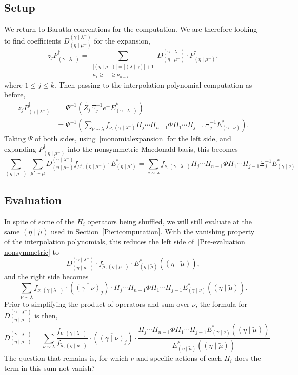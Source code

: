 \documentclass[ALCO]{cedram}
\newcommand{\Estar}[1]{E^*_{#1}}
\newcommand{\PB}[1]{P_{#1}^\dagger}
\newcommand{\nudom}{{( \lambda \mid \gamma )}}
\newcommand{\lambdagamma}{{\nudom}}
\newcommand{\gammalambdamin}{{(\gamma \mid \lambda^-)}}
\newcommand{\gammanu}{{(\gamma \mid \nu)}}
\newcommand{\etamu}{{(\eta \mid \mu^-)}}
\newcommand{\etamuprime}{{(\eta \mid \mu')}}
\newcommand{\mutilde}{{\widetilde{\mu}}}
\newcommand{\etamutilde}{{(\eta \mid \widetilde{\mu})}}
\newcommand{\etamumin}{{(\eta \mid \mu^-)}}
\newcommand{\fnu}{f_{\nu, \gammalambdamin}}
\newcommand{\DBaratta}{D_{\etamumin}^\gammalambdamin}
\begin{document}
\subsection{Setup}
We return to Baratta conventions for the computation. We are therefore looking to find coefficients $\DBaratta$ for the expansion,
\begin{equation} z_j \PB{\gammalambdamin} =\sum_{\substack{|\etamu| = |\lambdagamma| + 1 \\ \mu_1 \geq \, \dotsm \, \geq \mu_{n-k}}}  \DBaratta \cdot \PB{\etamumin}, \end{equation}
where $1\leq j \leq k$. Then passing to the interpolation polynomial computation as before,
\begin{align*}
    z_j \PB{\gammalambdamin} &= \Psi^{-1} \left(\widetilde{Z_j}  \Xi_j^{-1} e^+ \Estar{\gammalambdamin} \right)\\
    &=\Psi^{-1} \left( \sum_{\nu \sim \lambda} \fnu H_j\dotsm H_{n-1} \Phi H_1 \dotsm H_{j-1} \Xi^{-1}_{j} \Estar{\gammanu}\right).
\end{align*}
Taking $\Psi$ of both sides, using~\eqref{monomialexpansion} for the left side, and expanding $\PB{\etamumin}$ into the nonsymmetric Macdonald basis, this becomes
\begin{equation}\label{Pre-evaluation nonsymmetric} \sum_{\etamumin}  \, \sum_{\mu' \sim \mu} \DBaratta  f_{\mu',\etamumin} \cdot \Estar{\etamuprime} = \sum_{\nu \sim \lambda} \fnu H_j\dotsm H_{n-1} \Phi H_1 \dotsm H_{j-1} \Xi^{-1}_{j} \Estar{\gammanu} \end{equation}


\subsection{Evaluation}
In spite of some of the $H_i$ operators being shuffled, we will still evaluate at the same $\etamutilde$ used in Section~\ref{Piericomputation}. With the vanishing property of the interpolation polynomials, this reduces the left side of~\eqref{Pre-evaluation nonsymmetric} to
\[
    \DBaratta \cdot f_{\mutilde,\etamumin} \cdot \Estar{\etamutilde}\left( \overline{\etamutilde}\right),\]
    and the right side becomes
\[\sum_{\nu \sim \lambda} \fnu \cdot \left( \overline{\gammanu}_j\right) \cdot H_j \dotsm H_{n-1} \Phi H_1 \dotsm H_{j-1}  \Estar{\gammanu} \left( \overline{\etamutilde}\right).
\]
Prior to simplifying the product of operators and sum over $\nu$, the formula for $\DBaratta$ is then,
\begin{equation}\label{prevanishing}
    \DBaratta = \sum_{\nu \sim \lambda} \frac{\fnu}{f_{\mutilde,\etamumin}} \cdot \left( \overline{\gammanu}_j\right) \cdot \frac{H_j \dotsm H_{n-1} \Phi H_1 \dotsm H_{j-1}  \Estar{\gammanu} \left( \overline{\etamutilde}\right)}{\Estar{\etamutilde}{\left(\overline{\etamutilde}\right)}}
\end{equation}
The question that remains is, for which $\nu$ and specific actions of each $H_i$ does the term in this sum not vanish?
\end{document}
